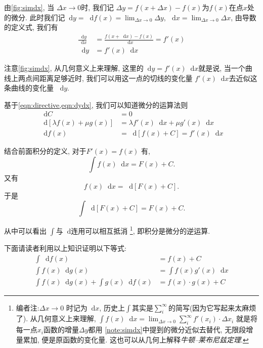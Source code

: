 \documentclass[UTF8]{mathrep}
\newcommand*{\dif}{\mathop{}\!\mathrm{d}}
\begin{document}
由\cref{fig:simdx}, 当 $\Delta x \to 0$时,
我们记 $\Delta y = f(x+\Delta x) - f(x)$为$f(x)$在点$x$处的微分.
此时我们记$\dif y = \dif f(x) = \lim_{\Delta x \to 0} \Delta y $, $\dif x
= \lim_{\Delta x\to 0} \Delta x$,
由导数的定义式, 我们有
\begin{align}
  \frac{\dif y}{\dif x} & = \frac{f(x+\dif x) - f(x)}{\dif x} = f'(x)
  \label{eqn:directive}                                               \\
  \dif y                & = f'(x) \dif x \label{eqn:dydx}
\end{align}

\begin{note}[微分近似] \label{note:simdx}
  注意\cref{fig:simdx}, 从几何意义上来理解, 这里的$\dif y = f'(x) \dif x $就是说,
  当一个曲线上两点间距离足够近时, 我们可以用这一点的切线的变化量
  $f'(x) \dif x $去近似这条曲线的变化量 $\dif y$.
\end{note}

基于\cref{eqn:directive,eqn:dydx}, 我们可以知道微分的运算法则
\begin{align}
  \dif C                           & = 0
  \\
  \dif [ \lambda f(x) + \mu g(x) ] & = \lambda f'(x) \dif x + \mu
  g'(x) \dif x \label{eqn:linearity}                                \\
  \dif f(x)                        & = \dif [f(x)+C] = f'(x) \dif x
\end{align}

结合前面积分的定义, 对于$F'(x) = f(x)$ 有,
\[
  \int f(x) \dif x = F(x) + C
.\]
又有
\[
  f(x) \dif x = \dif[F(x) +C]
.\]
于是
\[
  \int \dif [F(x) +C] = F(x)+C
.\]

从中可以看出 $\int \text{与} \dif $连用可以相互抵消
\footnote{
  编者注:$\Delta x \to 0$ 时记为$\dif x$,
  历史上$\int $其实是$\sum_{i}^{\infty}$的简写(因为它写起来太麻烦了).
  从几何意义上来理解,
  $\int f(x) \dif x = \lim_{\Delta x \to 0} \sum_{i}^{\infty} f'(x_i)
  \cdot \Delta x_i$
  就是将每一点$x_i$函数的增量$\Delta y$都用 \cref{note:simdx}中提到的微分近似去替代,
  无限段增量累加, 便是原函数的变化量. 这也可以从几何上解释\emph{牛顿--莱布尼兹定理}.
},
即积分是微分的逆运算.

下面请读者利用以上知识证明以下等式:
\begin{align}
  \int \dif f(x)                              & = f(x)+C
  \\
  \int f(x) \dif g(x)                         & = \int f(x)g'(x) \dif
  x                                                                   \\
  \int  f(x) \dif g(x) + \int  g(x) \dif f(x) & = f(x) \cdot g(x) +C
  \label{eqn:fxgx'}
\end{align}
\end{document}
